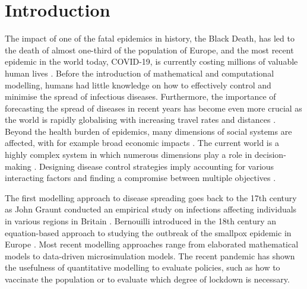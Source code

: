\documentclass[smallextended]{svjour3}       %
\begin{document}



\section{Introduction}

The impact of one of the fatal epidemics in history, the Black Death, has led to the death of almost one-third of the population of Europe, and the most recent epidemic in the world today, COVID-19, is currently costing millions of valuable human lives \cite{glatter2021history}. Before the introduction of mathematical and computational modelling, humans had little knowledge on how to effectively control and minimise the spread of infectious diseases. Furthermore, the importance of forecasting the spread of diseases in recent years has become even more crucial as the world is rapidly globalising with increasing travel rates and distances \cite{saker2004globalization}. Beyond the health burden of epidemics, many dimensions of social systems are affected, with for example broad economic impacts \cite{boucekkine2021economics}. The current world is a highly complex system in which numerous dimensions play a role in decision-making \cite{bickley2021does}. Designing disease control strategies imply accounting for various interacting factors and finding a compromise between multiple objectives \cite{kaszowska2022immunity}.

The first modelling approach to disease spreading goes back to the 17th century as John Graunt conducted an empirical study on infections affecting individuals in various regions in Britain \cite{morabia2013epidemiology}. Bernouilli introduced in the 18th century an equation-based approach to studying the outbreak of the smallpox epidemic in Europe \cite{dietz2002daniel}. Most recent modelling approaches range from elaborated mathematical models to data-driven microsimulation models. The recent pandemic has shown the usefulness of quantitative modelling to evaluate policies, such as how to vaccinate the population \cite{bosetti2022epidemiology} or to evaluate which degree of lockdown is necessary.
\end{document}
